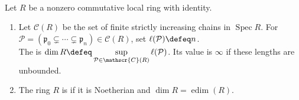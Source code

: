 \begin{definition} \label{def:krull-dimension-and-regular-local-ring}
\\
Let $R$ be a nonzero commutative local ring with identity.
\begin{enumerate}[label=(\roman*)]
\setlength{\itemsep}{0pt}
\item Let $\mathscr{C}(R)$ be the set of finite strictly increasing chains in $\operatorname{Spec}R$. For $\mathcal{P}=(\mathfrak{p}_0\subsetneq\cdots\subsetneq\mathfrak{p}_n)\in\mathscr{C}(R)$, set $\ell(\mathcal{P})\defeq n$.\\
The  is $\dim R\defeq\sup\limits_{\mathcal{P}\in\mathscr{C}(R)}\ell(\mathcal{P})$. Its value is $\infty$ if these lengths are unbounded.
\item The ring $R$ is  if it is Noetherian and $\dim R=\operatorname{edim}(R)$.
\end{enumerate}
\end{definition}
